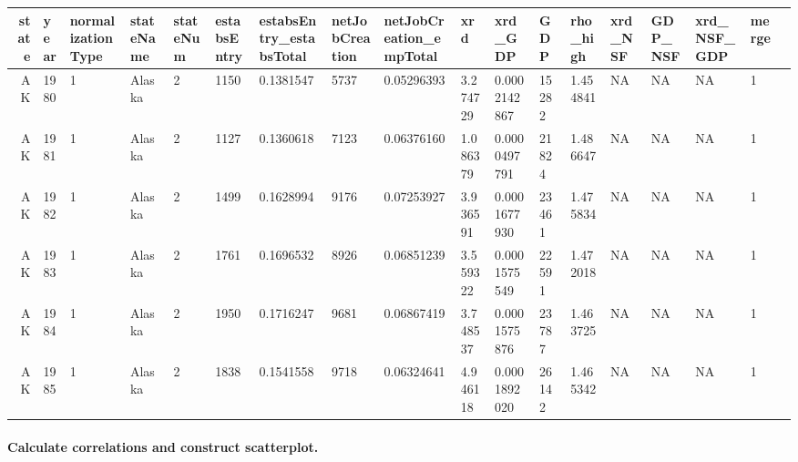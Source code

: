\documentclass[11pt]{article}
\begin{document}
    \begin{tabular}{r|lllllllllllllllll}
 state & year & normalizationType & stateName & stateNum & estabsEntry & estabsEntry\_estabsTotal & netJobCreation & netJobCreation\_empTotal & xrd & xrd\_GDP & GDP & rho\_high & xrd\_NSF & GDP\_NSF & xrd\_NSF\_GDP & merge\\
\hline
	 AK           & 1980         & 1            & Alaska       & 2            & 1150         & 0.1381547    & 5737         & 0.05296393   & 3.274729     & 0.0002142867 & 15282        & 1.454841     & NA           & NA           & NA           & 1           \\
	 AK           & 1981         & 1            & Alaska       & 2            & 1127         & 0.1360618    & 7123         & 0.06376160   & 1.086379     & 0.0000497791 & 21824        & 1.486647     & NA           & NA           & NA           & 1           \\
	 AK           & 1982         & 1            & Alaska       & 2            & 1499         & 0.1628994    & 9176         & 0.07253927   & 3.936591     & 0.0001677930 & 23461        & 1.475834     & NA           & NA           & NA           & 1           \\
	 AK           & 1983         & 1            & Alaska       & 2            & 1761         & 0.1696532    & 8926         & 0.06851239   & 3.559322     & 0.0001575549 & 22591        & 1.472018     & NA           & NA           & NA           & 1           \\
	 AK           & 1984         & 1            & Alaska       & 2            & 1950         & 0.1716247    & 9681         & 0.06867419   & 3.748537     & 0.0001575876 & 23787        & 1.463725     & NA           & NA           & NA           & 1           \\
	 AK           & 1985         & 1            & Alaska       & 2            & 1838         & 0.1541558    & 9718         & 0.06324641   & 4.946118     & 0.0001892020 & 26142        & 1.465342     & NA           & NA           & NA           & 1           \\
\end{tabular}


    
    \hypertarget{calculate-correlations-and-construct-scatterplot.}{%
\paragraph{Calculate correlations and construct
scatterplot.}\label{calculate-correlations-and-construct-scatterplot.}}
\end{document}
